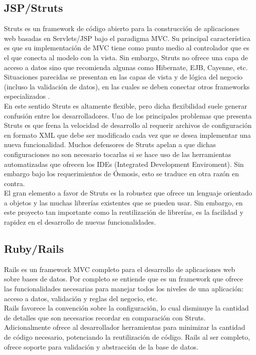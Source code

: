 \subsection{JSP/Struts}
Struts es un framework de código abierto para la construcción de aplicaciones web basadas en Servlets/JSP bajo el paradigma MVC. Su principal característica es que su implementación de MVC tiene como punto medio al controlador que es el que conecta al modelo con la vista. Sin embargo, Struts no ofrece una capa de acceso a datos sino que recomienda algunas como Hibernate, EJB, Cayenne, etc. Situaciones parecidas se presentan en las capas de vista y de lógica del negocio (incluso la validación de datos), en las cuales se deben conectar otros frameworks especializados \citep{Struts_2008}. \\

En este sentido Struts es altamente flexible, pero dicha flexibilidad suele generar confusión entre los desarrolladores. Uno de los principales problemas que presenta Struts es que frena la velocidad de desarrollo al requerir archivos de configuración en formato XML que debe ser modificado cada vez que se desea implementar una nueva funcionalidad. Muchos defensores de Struts apelan a que dichas configuraciones no son necesario tocarlas si se hace uso de las herramientas automatizadas que ofrecen los IDEs (Integrated Development Enviroment). Sin embargo bajo los requerimientos de Ósmosis, esto se traduce en otra razón en contra. \\

El gran elemento a favor de Struts es la robustez que ofrece un lenguaje orientado a objetos y las muchas librerías existentes que se pueden usar. Sin embargo, en este proyecto tan importante como la reutilización de librerías, es la facilidad y rapidez en el desarrollo de nuevas funcionalidades.

\subsection{Ruby/Rails}
Rails es un framework MVC completo para el desarrollo de aplicaciones web sobre bases de datos. Por completo se entiende que es un framework que ofrece las funcionalidades necesarias para manejar todos los niveles de una aplicación: acceso a datos, validación y reglas del negocio, etc.\\

Rails favorece la convención sobre la configuración, lo cual disminuye la cantidad de detalles que son necesarios recordar en comparación con Struts. Adicionalmente ofrece al desarrollador herramientas para minimizar la cantidad de código necesario, potenciando la reutilización de código. Rails al ser completo, ofrece soporte para validación y abstracción de la base de datos. \\

